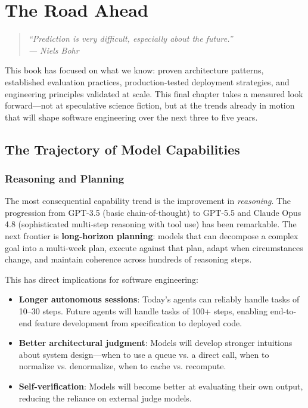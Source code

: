 \chapter{The Road Ahead}
\label{ch:road-ahead}

\begin{quote}
\itshape
``Prediction is very difficult, especially about the future.''\\
--- Niels Bohr
\end{quote}

\vspace{0.5cm}

\noindent
This book has focused on what we know: proven architecture patterns, established evaluation practices, production-tested deployment strategies, and engineering principles validated at scale. This final chapter takes a measured look forward---not at speculative science fiction, but at the trends already in motion that will shape software engineering over the next three to five years.


\section{The Trajectory of Model Capabilities}

\subsection{Reasoning and Planning}

The most consequential capability trend is the improvement in \emph{reasoning}. The progression from GPT-3.5 (basic chain-of-thought) to GPT-5.5 and Claude Opus 4.8 (sophisticated multi-step reasoning with tool use) has been remarkable. The next frontier is \textbf{long-horizon planning}: models that can decompose a complex goal into a multi-week plan, execute against that plan, adapt when circumstances change, and maintain coherence across hundreds of reasoning steps.

This has direct implications for software engineering:

\begin{itemize}[leftmargin=*]
    \item \textbf{Longer autonomous sessions}: Today's agents can reliably handle tasks of 10--30 steps. Future agents will handle tasks of 100+ steps, enabling end-to-end feature development from specification to deployed code.
    \item \textbf{Better architectural judgment}: Models will develop stronger intuitions about system design---when to use a queue vs. a direct call, when to normalize vs. denormalize, when to cache vs. recompute.
    \item \textbf{Self-verification}: Models will become better at evaluating their own output, reducing the reliance on external judge models.
\end{itemize}

